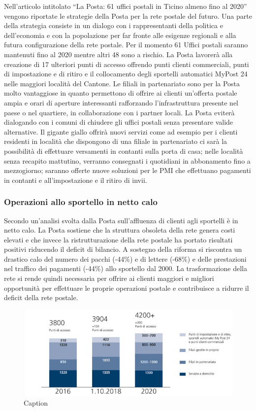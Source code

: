 Nell’articolo intitolato “La Posta: 61 uffici postali in Ticino almeno fino al 2020” vengono riportate le strategie della Posta per la rete postale del futuro. Una parte della strategia consiste in un dialogo con i rappresentanti della politica e dell’economia e con la popolazione per far fronte alle esigenze regionali e alla futura configurazione della rete postale. Per il momento 61 Uffici postali saranno mantenuti fino al 2020 mentre altri 48 sono a rischio. La Posta lavorerà alla creazione di 17 ulteriori punti di accesso offrendo punti clienti commerciali, punti di impostazione e di ritiro e il collocamento degli sportelli automatici MyPost 24 nelle maggiori località del Cantone. Le filiali in partenariato sono per la Posta molto vantaggiose in quanto permettono di offrire ai clienti un’offerta postale ampia e orari di aperture interessanti rafforzando l’infrastruttura presente nel paese o nel quartiere, in collaborazione con i partner locali. La Posta eviterà dialogando con i comuni di chiudere gli uffici postali senza presentare valide alternative. Il gigante giallo offrirà nuovi servizi come ad esempio per i clienti residenti in località che dispongono di una filiale in partenariato ci sarà la possibilità di effettuare versamenti in contanti sulla porta di casa; nelle località senza recapito mattutino, verranno consegnati i quotidiani in abbonamento fino a mezzogiorno; saranno offerte nuove soluzioni per le PMI che effettuano pagamenti in contanti e all’impostazione e il ritiro di invii. 

\subsubsection{Operazioni allo sportello in netto calo}
Secondo un’analisi svolta dalla Posta sull’affluenza di clienti agli sportelli è in netto calo. La Posta sostiene che la struttura obsoleta della rete genera costi elevati e che invece la ristrutturazione della rete postale ha portato risultati positivi riducendo il deficit di bilancio. A sostegno della riforma si riscontra un drastico calo del numero dei pacchi (-44\%) e di lettere (-68\%) e delle prestazioni nel traffico dei pagamenti (-44\%) allo sportello dal 2000. La trasformazione della rete si rende quindi necessaria per offrire ai clienti maggiori e migliori opportunità per effettuare le proprie operazioni postale e contribuisce a ridurre il deficit della rete postale.
\begin{figure}[h]
    \centering
    \includegraphics{Affluenza sportelli.PNG}
    \caption{Caption}
    \label{fig:my_label}
\end{figure}


